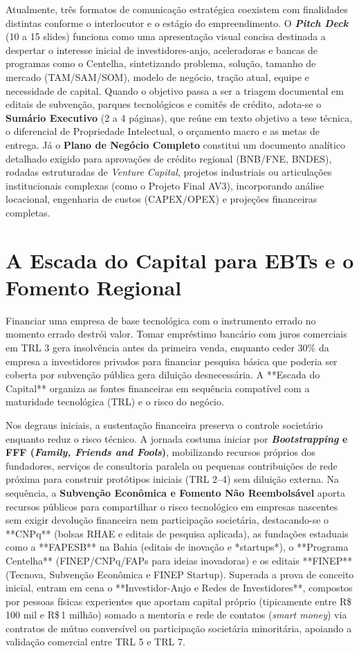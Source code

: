 Atualmente, três formatos de comunicação estratégica coexistem com finalidades distintas conforme o interlocutor e o estágio do empreendimento. O \textbf{\textit{Pitch Deck}} (10 a 15 slides) funciona como uma apresentação visual concisa destinada a despertar o interesse inicial de investidores-anjo, aceleradoras e bancas de programas como o Centelha, sintetizando problema, solução, tamanho de mercado (TAM/SAM/SOM), modelo de negócio, tração atual, equipe e necessidade de capital. Quando o objetivo passa a ser a triagem documental em editais de subvenção, parques tecnológicos e comitês de crédito, adota-se o \textbf{Sumário Executivo} (2 a 4 páginas), que reúne em texto objetivo a tese técnica, o diferencial de Propriedade Intelectual, o orçamento macro e as metas de entrega. Já o \textbf{Plano de Negócio Completo} constitui um documento analítico detalhado exigido para aprovações de crédito regional (BNB/FNE, BNDES), rodadas estruturadas de \textit{Venture Capital}, projetos industriais ou articulações institucionais complexas (como o Projeto Final AV3), incorporando análise locacional, engenharia de custos (CAPEX/OPEX) e projeções financeiras completas.

\section{A Escada do Capital para EBTs e o Fomento Regional}

Financiar uma empresa de base tecnológica com o instrumento errado no momento errado destrói valor. Tomar empréstimo bancário com juros comerciais em TRL 3 gera insolvência antes da primeira venda, enquanto ceder 30\% da empresa a investidores privados para financiar pesquisa básica que poderia ser coberta por subvenção pública gera diluição desnecessária. A **Escada do Capital** organiza as fontes financeiras em sequência compatível com a maturidade tecnológica (TRL) e o risco do negócio.

Nos degraus iniciais, a sustentação financeira preserva o controle societário enquanto reduz o risco técnico. A jornada costuma iniciar por \textbf{\textit{Bootstrapping} e FFF (\textit{Family, Friends and Fools})}, mobilizando recursos próprios dos fundadores, serviços de consultoria paralela ou pequenas contribuições de rede próxima para construir protótipos iniciais (TRL 2–4) sem diluição externa. Na sequência, a \textbf{Subvenção Econômica e Fomento Não Reembolsável} aporta recursos públicos para compartilhar o risco tecnológico em empresas nascentes sem exigir devolução financeira nem participação societária, destacando-se o **CNPq** (bolsas RHAE e editais de pesquisa aplicada), as fundações estaduais como a **FAPESB** na Bahia (editais de inovação e *startups*), o **Programa Centelha** (FINEP/CNPq/FAPs para ideias inovadoras) e os editais **FINEP** (Tecnova, Subvenção Econômica e FINEP Startup). Superada a prova de conceito inicial, entram em cena o **Investidor-Anjo e Redes de Investidores**, compostos por pessoas físicas experientes que aportam capital próprio (tipicamente entre R\$\,100 mil e R\$\,1 milhão) somado a mentoria e rede de contatos (\textit{smart money}) via contratos de mútuo conversível ou participação societária minoritária, apoiando a validação comercial entre TRL 5 e TRL 7.

